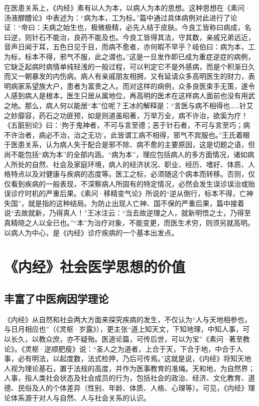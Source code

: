 \documentclass[12pt]{ctexbook}
\begin{document}
在医患关系上，《内经》素有以人为本，以病人为本的思想。这种思想在《素问·汤液醪醴论》中表述为：“病为本，工为标。”篇中通过具体病例对此进行了论证：“帝曰：夫病之始生也，极微极精，必先人结于皮肤。今良工皆称曰病成，名曰逆，则针石不能治，良药不能及也。今良工皆得其法，守其数，亲戚兄弟远近，音声日闻于耳，五色日见于目，而病不愈者，亦何暇不早乎？岐伯曰：病为本，工为标，标本不得，邪气不服，此之谓也。”这是一旦发作即已成为重症逆症的病例，它缺乏起病时病情单纯轻浅的一般过程，可以判定它不是外感病，而是个积渐日久而又一朝暴发的内伤病。病人有亲戚朋友相拥，又有延请众多高明医生的财力，表明病家系望族大户，患者为富贵之人。而对这样的病例，众多良医束手无策，遂令人感到病人是根本，医生只居从属地位，再高明的医术在这样病人面前也没有用武之地。那么，病人何以能居“本”位呢？王冰的解释是：“言医与病不相得也……针艾之妙靡容，药石之功匪预，如是则道虽昭著，万举万全，病不许治，欲奚为疗！《五脏别论》曰：‘拘于鬼神者，不可与言至德；恶于针石者，不可与言至巧；病不许治者，病必不治，治之无功’。此皆谓工病不相得，邪气不宾服也。”王氏着眼于医患关系，认为病人失于配合是邪不除、病不愈的主要原因，这是切题之语，但尚不能包括“病为本”的全部内涵。“病为本”，理应包括病人的多方面情况，诸如病人所处的自然、社会及家庭环境，病人的经济状况、职业、经历、嗜好、体质、人格特点以及对健康与疾病的态度等。医工之标，必须随这个病本而转移。否则，仅仅看到疾病的一般表现，不深察病人所固有的特定情况，必然会发生误诊误治或贻误诊疗时机的严重后果。《素问·移精变气论》所说的“逆从倒行，标本不得，亡神失国”，就是指的这种结局。为防止出现人亡神、国不保的严重后果，篇中接着说“去故就新，乃得真人！”王冰注云：“当去故逆理之人，就新明悟之士，乃得至真精晓之人以全已也。”“本”为治疗对象，不能变更，而医生术穷，则须另就高明。以病人为中心，是《内经》诊疗疾病的一个基本出发点。

\section{《内经》社会医学思想的价值}%

\subsection{丰富了中医病因学理论}%

《内经》从自然和社会两大方面来探究疾病的发生，不仅认为“人与天地相参也，与日月相应也”（《灵枢·岁露》），更主张“道上知天文，下知地理，中知人事，可以长久，以教众庶，亦不疑殆。医道论篇，可传后世，可以为宝”《素问·著至教论》。《灵枢·逆顺肥瘦》说：“圣人之为道者，上合于天，下合于地，中合于人事，必有明法，以起度数，法式检押，乃后可传焉。”这就是说，《内经》将知天地人视为理论基石，置于法规的高度，并作为医事教育的准绳。天和地，为自然界；人事，指人类社会状态及社会成员的行为，包括社会的政治、经济、文化教育、道德、民俗及人的个体差异（性别、年龄、体质、人格、心理等）。可见，《内经》理论体系源于对人与自然、人与社会关系的认识。
\end{document}
